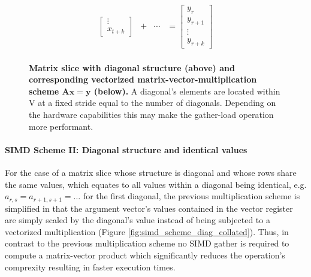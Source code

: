 \begin{figure}[ht]
$$\begin{matrix}
\begin{bmatrix}
                                                                                \vdots \\
                                                                                x_{t+k}
                                                                              \end{bmatrix} & + & \cdots & = \begin{bmatrix}
                                                                                                                 y_{r} \\
                                                                                                                 y_{r+1} \\
                                                                                                                 \vdots \\
                                                                                                                 y_{r+k}
                                                                                                                \end{bmatrix}\\

        \end{matrix}
        $$
        \caption[Matrix slice with diagonal structure and corresponding vectorized matrix-vector multiplication scheme.]{\textbf{Matrix slice with diagonal structure (above) and corresponding vectorized matrix-vector-multiplication scheme $\bm{Ax = y}$ (below).} A diagonal's elements are located within V at a fixed stride equal to the number of diagonals. Depending on the hardware capabilities this may make the gather-load operation more performant.}
        \label{fig:simd_scheme_diag}
      \end{figure}

      \paragraph{SIMD Scheme II: Diagonal structure and identical values}

      For the case of a matrix slice whose structure is diagonal and whose rows share the same values, which equates to all values within a diagonal being identical, e.g. $a_{r,s} = a_{r+1, s+1} = \ldots$ for the first diagonal, the previous multiplication scheme is simplified in that the argument vector's values contained in the vector register are simply scaled by the diagonal's value instead of being subjected to a vectorized multiplication (Figure \ref{fig:simd_scheme_diag_collated}). Thus, in contrast to the previous multiplication scheme no SIMD gather is required to compute a matrix-vector product which significantly reduces the operation's comprexity resulting in faster execution times.

